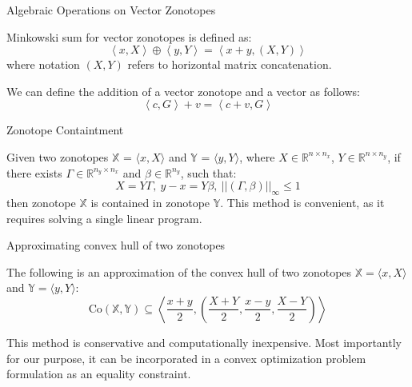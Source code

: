 \documentclass{beamer}
\newcommand{\Zo}[2] {\left\langle {#1},{#2}
	\right\rangle}
\begin{document}
\begin{frame}{Algebraic Operations on Vector Zonotopes}
	\begin{flushleft}
		
		Minkowski sum for vector zonotopes is defined as:
		\begin{equation}
			\label{eq:MinkowskiDef}
			\Zo{x}{X} \oplus \Zo{y}{Y} = \Zo{x + y}{(X, Y)}
		\end{equation}
		where notation $(X, Y)$ refers to horizontal matrix concatenation. 
		
		\bigskip
		
		We can define the addition of a vector zonotope and a vector as follows:
		\begin{equation} 
			\label{eq_zonotope_vector_addition}
			\Zo{c}{G}+v = \Zo{c+v}{G}
		\end{equation}
		
		
	\end{flushleft}
\end{frame}



\begin{frame}{Zonotope Containtment}
	\begin{flushleft}
		
		
		Given two zonotopes $\mathbb{X}$ = $\langle x,X \rangle$ and $\mathbb{Y}$ = $\langle y,Y \rangle$, where $X \in \mathbb{R}^{n \times n_x}$, $Y \in \mathbb{R}^{n \times n_y}$, if there exists $\Gamma \in \mathbb{R}^{n_y \times n_x}$ and $\beta \in \mathbb{R}^{n_y}$, such that:
		\begin{equation}
			\label{eq:containment}
			X = Y\Gamma, \ y - x = Y\beta, \  ||(\Gamma,\beta)||_\infty \leq 1
		\end{equation}
		then zonotope $\mathbb{X}$ is contained in zonotope $\mathbb{Y}$. This method is convenient, as it requires solving a single linear program.
		
	\end{flushleft}
\end{frame}


\begin{frame}{Approximating convex hull of two zonotopes}
	\begin{flushleft}
		
		The following is an approximation of the convex hull of two zonotopes $\mathbb{X} = \langle x,X \rangle$ and $\mathbb{Y} = \langle y,Y \rangle$:
		\begin{equation}
			\label{eq_convhull}
			\text{Co}(\mathbb{X}, \mathbb{Y}) \subseteq 
			\Zo{\frac{x + y}{2}}
			{\left(
				\frac{X + Y}{2},\frac{x - y}{2},\frac{X - Y}{2}
				\right)}
		\end{equation}
		
		This method is conservative and computationally inexpensive. Most importantly for our purpose, it can be incorporated in a convex optimization problem formulation as an equality constraint. 
		
		
	\end{flushleft}
\end{frame}
\end{document}
